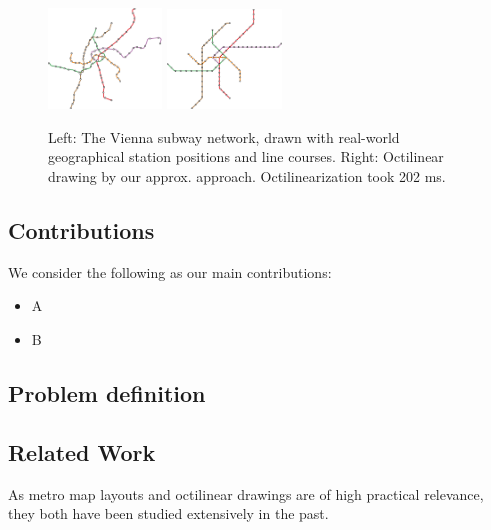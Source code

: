 \documentclass[sigconf]{acmart}
\begin{document}
\begin{figure}
    \centering
	\vspace{-0.6cm}
	\includegraphics[width=0.27\textwidth]{figures/octi_input.pdf}
	\hspace{-1.3cm}
	\includegraphics[width=0.27\textwidth]{figures/octi.pdf}
	\vspace{-.5cm}
	\caption{Left: The Vienna subway network, drawn with real-world geographical station positions and line courses. Right: Octilinear drawing by our approx. approach. Octilinearization took 202 ms.}
	\label{FIG:wien}
	\vspace{-.65cm}
\end{figure}

\subsection{Contributions}
\label{SEC:contrib}
%
We consider the following as our main contributions:
\begin{itemize}[parsep=0.5mm,leftmargin=0mm,itemindent=4mm]
\item A
\item B
\end{itemize}

\subsection{Problem definition}
\label{SEC:def}

\subsection{Related Work}
\label{SEC:related}

As metro map layouts and octilinear drawings are of high practical relevance, they both have been studied extensively in the past. 
\end{document}
